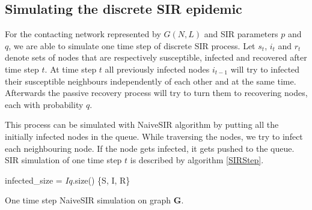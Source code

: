 \documentclass[times, utf8, diplomski]{fer}
\begin{document}
\subsection{Simulating the discrete SIR epidemic}

For the contacting network represented by $G(N, L)$ and SIR parameters $p$ and $q$, we are able to simulate one time step of discrete SIR process. Let $s_t$, $i_t$ and $r_t$ denote sets of nodes that are respectively susceptible, infected and recovered after time step $t$. At time step $t$ all previously infected nodes $i_{t - 1}$ will try to infected their susceptible neighbours independently of each other and at the same time. Afterwards the passive recovery process will try to turn them to recovering nodes, each with probability $q$.

This process can be simulated with NaiveSIR algorithm  \cite{NaiveSIR} by putting all the initially infected nodes in the queue. While traversing the nodes, we try to infect each neighbouring node. If the node gets infected, it gets pushed to the queue. SIR simulation of one time step $t$ is described by algorithm \ref{SIRStep}.
\vspace{10mm}

\begin{algorithm}[H]
 infected\_size = $Iq$.size()\;
  \Return \{S, I, R\}
 \label{SIRStep}
 \caption{One time step NaiveSIR simulation on graph $\mathbf{G}$.}
\end{algorithm}
\end{document}
